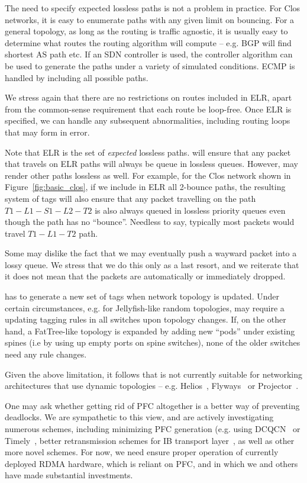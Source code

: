  The need to specify expected lossless paths is not a
problem in practice. For Clos networks, it is easy to enumerate paths with any
given limit on bouncing. For a general topology, as long as the routing is
traffic agnostic, it is usually easy to determine what routes the routing
algorithm will compute -- e.g. BGP will find shortest AS path etc.  If an
SDN controller is used, the controller algorithm can be used to generate the
paths under a variety of simulated conditions. ECMP is handled by including all possible
paths.

We stress again that there are no restrictions on routes included in ELR, apart
from the common-sense requirement that each route be loop-free. Once ELR is
specified, we can handle any subsequent abnormalities, including routing loops
that may form in error. 

Note that ELR is the set of {\em expected} lossless paths. \sysname{} will
ensure that any packet that travels on ELR paths will always be queue in
lossless queues. However, \sysname{} may render other paths lossless as well.
For example, for the Clos network shown in Figure~\ref{fig:basic_clos}, if we
include in ELR all 2-bounce paths, the resulting system of tags will also ensure
that any packet travelling on the path $T1-L1-S1-L2-T2$ is also always queued in
lossless priority queues even though the path has no ``bounce''. Needless to
say, typically most packets would travel $T1-L1-T2$ path.

 Some may dislike the fact that we may eventually push
a wayward packet into a lossy queue. We stress that we do this only as a last
resort, and we reiterate that it does not mean that the packets are
automatically or immediately dropped.

 \sysname{} has to generate a new set of
tags when network topology is updated. Under certain circumstances, e.g.  for
Jellyfish-like random topologies, \sysname{} may require a updating tagging
rules in all switches upon topology changes.  If, on the other hand, a
FatTree-like topology is expanded by adding new ``pods'' under existing spines
(i.e by using up empty ports on spine switches), none of the older switches need
any rule changes.

 Given the above limitation, it follows that \sysname{}
is not currently suitable for networking architectures that use dynamic
topologies -- e.g. Helios~\cite{helios}, Flyways~\cite{flyways} or
Projector~\cite{projector}. 

 One may ask whether getting rid of PFC altogether is a
better way of preventing deadlocks.  We are sympathetic to this view, and are
actively investigating numerous schemes, including minimizing PFC generation
(e.g.  using DCQCN~\cite{dcqcn} or Timely~\cite{timely}, better retransmission
schemes for IB transport layer~\cite{xxx}, as well as other more novel schemes.
For now, we need \sysname{} ensure proper operation of currently deployed RDMA
hardware, which is reliant on PFC, and in which we and others have made
substantial investments.

